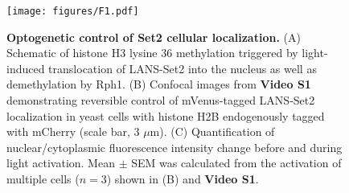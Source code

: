 \documentclass[12pt]{biorxiv}
\begin{document}
\begin{spacing}{2}
%
%
%
%

\begin{figure}
\center
\texttt{[image: figures/F1.pdf]}
\vspace*{2mm}
\caption{\textbf{Optogenetic control of Set2 cellular localization.} (A) Schematic of histone H3 lysine 36 methylation triggered by light-induced translocation of LANS-Set2 into the nucleus as well as demethylation by Rph1. (B) Confocal images from \textbf{Video S1} demonstrating reversible control of mVenus-tagged LANS-Set2 localization in yeast cells with histone H2B endogenously tagged with mCherry (scale bar, 3 $\mu$m). (C) Quantification of nuclear/cytoplasmic fluorescence intensity change before and during light activation. Mean $\pm$ SEM was calculated from the activation of multiple cells ($n = 3$) shown in (B) and \textbf{Video S1}.}
\end{figure}


\end{spacing}
\end{document}
